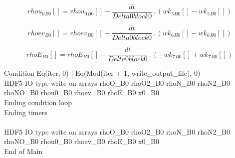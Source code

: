\documentclass{article}
\begin{document}
\begin{dmath}{rhou_{0}{_{B0}}}[{}] = {rhou_{0}{_{B0}}}[{}] - \frac{dt}{Delta0block0} \,.\, \left({wk_{5}{_{B0}}}[{}] - {wk_{5}{_{B0}}}[{}]\right)\end{dmath}

\begin{dmath}{rhoev{_{B0}}}[{}] = {rhoev{_{B0}}}[{}] - \frac{dt}{Delta0block0} \,.\, \left({wk_{6}{_{B0}}}[{}] - {wk_{6}{_{B0}}}[{}]\right)\end{dmath}

\begin{dmath}{rhoE{_{B0}}}[{}] = {rhoE{_{B0}}}[{}] - \frac{dt}{Delta0block0} \,.\, \left(- {wk_{7}{_{B0}}}[{}] + {wk_{7}{_{B0}}}[{}]\right)\end{dmath}

\noindent Condition Eq(iter, 0) | Eq(Mod(iter + 1, write_output_file), 0)\\\noindent HDF5 IO type write on arrays rhoO_B0 rhoO2_B0 rhoN_B0 rhoN2_B0 rhoNO_B0 rhou0_B0 rhoev_B0 rhoE_B0 x0_B0\\\noindent Ending condition loop %
\\\noindent Ending timers\\
\\\noindent HDF5 IO type write on arrays rhoO_B0 rhoO2_B0 rhoN_B0 rhoN2_B0 rhoNO_B0 rhou0_B0 rhoev_B0 rhoE_B0 x0_B0\\\noindent End of Main\\
\end{document}
